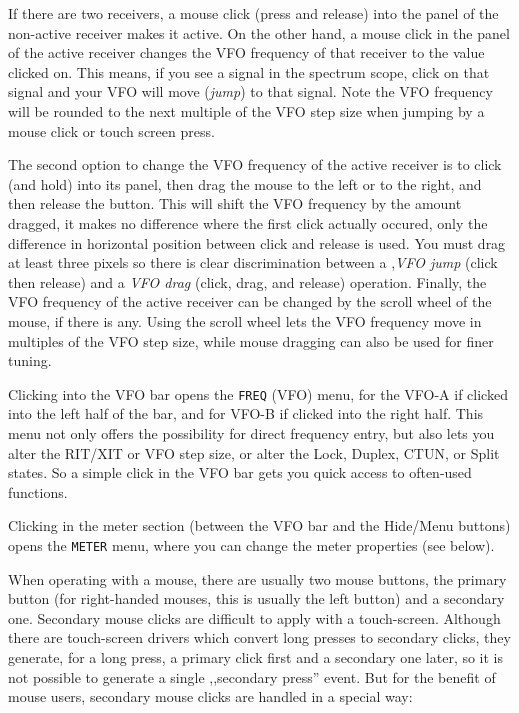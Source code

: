 \documentclass[12pt]{book}
\def\bltt#1{\texttt{\color{blue}#1}}
\begin{document}
If there are two receivers, a mouse click (press and release) into
the panel of the non-active receiver makes it active. On the other
hand, a mouse click in the panel of the active receiver changes
the VFO frequency of that receiver to the value clicked on.
This means, if you see a signal in the spectrum scope, click
on that signal and your VFO will move (\textit{jump}) to that signal.
Note the VFO frequency will be  rounded to the next multiple of
the VFO step size when jumping by a mouse  click or
touch screen press.

The second option to change the VFO frequency of the active receiver
is to click (and hold) into its panel, then drag the mouse to the left
or to the right, and then release the button. This will shift the
VFO frequency by the amount dragged, it makes no difference 
where the first click actually occured, only the difference
in horizontal position between click and release is used. You must
drag at least three pixels so there is clear discrimination between
a ,\textit{VFO jump} (click then release) and a \textit{VFO drag} (click, drag,
and release) operation. Finally, the VFO frequency of the active
receiver can be changed by the scroll wheel of the mouse, if there
is any. Using the scroll wheel lets the VFO frequency move in multiples
of the VFO step size, while mouse dragging can also be used for
finer tuning.

Clicking into the VFO bar opens the \bltt{FREQ} (VFO) menu,
for the VFO-A if clicked into the left half of the bar, and for
VFO-B if clicked into the right half. This menu not only offers
the possibility for direct frequency entry, but also lets you 
alter the RIT/XIT or VFO step size, or alter the Lock, Duplex,
CTUN, or Split states. So a simple click in the VFO bar 
gets you quick access to often-used functions.

Clicking in the meter section (between the VFO bar and the
Hide/Menu buttons) opens the \bltt{METER} menu, where
you can change the meter properties (see below).

When operating with a mouse, there are usually two mouse buttons,
the primary button (for right-handed mouses, this is usually
the left button) and a secondary one. Secondary mouse clicks
are difficult to apply with a touch-screen. Although there are
touch-screen drivers which convert long presses to secondary clicks,
they generate, for a long press, a primary click first and a
secondary one later, so it is not possible to generate a
single ,,secondary press'' event. But for the benefit of
mouse users, secondary mouse clicks are handled in a special way:
\end{document}
